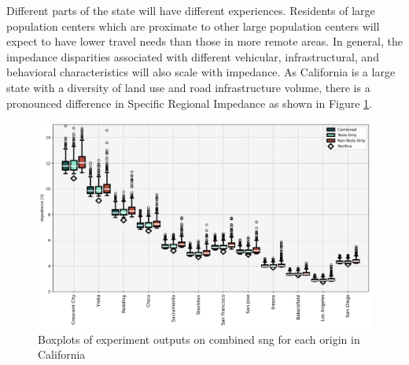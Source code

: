 \begin{multicols}{2}
Different parts of the state will have different experiences. Residents of large population centers which are proximate to other large population centers will expect to have lower travel needs than those in more remote areas. In general, the impedance disparities associated with different vehicular, infrastructural, and behavioral characteristics will also scale with impedance. As California is a large state with a diversity of land use and road infrastructure volume, there is a pronounced difference in Specific Regional Impedance as shown in Figure \ref{fig:networks_boxplots_locations}.

\end{multicols}

\begin{figure}[H]
\centering
\includegraphics[width = \linewidth]{figs/Networks_Boxplots_Weighted_Specific_Impedance_2.png}
\caption{Boxplots of experiment outputs on combined \gls{sng} for each origin in California}
\label{fig:networks_boxplots_locations}
\end{figure}

